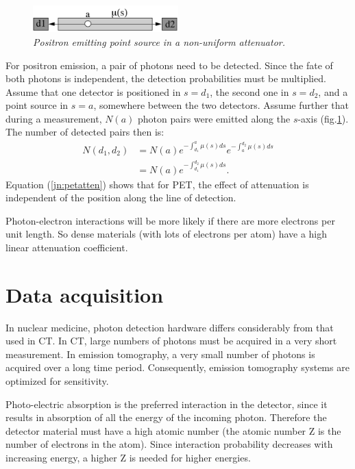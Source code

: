 \documentclass[11pt,oneside]{article}
\begin{document}
\begin{figure}[tb]
\centering
\includegraphics[width=0.5\textwidth]{figs/fig_jnpetatten.pdf}
\caption{\label{fig:jn_petatten} \emph{Positron emitting point source in a
non-uniform attenuator.}}
\end{figure}
For positron emission, a pair of photons need to be detected. Since the fate
of both photons is independent, the detection probabilities must be
multiplied.  Assume that one detector is positioned in $s = d_1$, the second
one in $s = d_2$, and a point source in $s = a$, somewhere between the two
detectors. Assume further that during a measurement, $N(a)$ photon pairs were
emitted along the $s$-axis (fig.\ref{fig:jn_petatten}). The number of
detected pairs then is:
\begin{align}
  N(d_1,d_2) &= N(a)  e^{- \int_{d_1}^a \mu(s) ds} e^{- \int_a^{d_2} \mu(s)
             ds} \\
             &= N(a)  e^{- \int_{d_1}^{d_2} \mu(s) ds}.
\label{jn:petatten}
\end{align}
Equation (\ref{jn:petatten}) shows that for PET, the effect of attenuation is
independent of the position along the line of detection.

Photon-electron interactions will be more likely if there are more electrons
per unit length. So dense materials (with lots of electrons per atom) have a
high linear attenuation coefficient.

\section{Data acquisition}

In nuclear medicine, photon detection hardware differs considerably from that
used in CT. In CT, large numbers of photons must be acquired in a very short
measurement. In emission tomography, a very small number of photons is
acquired over a long time period. Consequently, emission tomography systems are
optimized for sensitivity.

Photo-electric absorption is the preferred interaction in the detector, since
it results in absorption of all the energy of the incoming photon. Therefore
the detector material must have a high atomic number (the atomic number Z is
the number of electrons in the atom). Since interaction probability decreases
with increasing energy, a higher Z is needed for higher energies.
\end{document}

